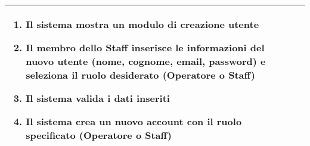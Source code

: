 \documentclass[a4paper]{report}
\begin{document}
\begin{table}[t!]
\begin{tabular}{|p{3.9cm}|p{9.9cm}|}
\begin{enumerate}[leftmargin=14pt,label=\arabic*.,labelsep=0.5em,topsep=0pt,partopsep=0pt,parsep=0pt,itemsep=0pt]
    \begin{enumerate}[label=\arabic{enumi}.\arabic*.,leftmargin=22pt,labelsep=0.5em,topsep=0pt,partopsep=0pt,parsep=0pt,itemsep=0pt]
        \item Il sistema mostra un modulo di creazione utente
        \item Il membro dello Staff inserisce le informazioni del nuovo utente (nome, cognome, email, password) e seleziona il ruolo desiderato (Operatore o Staff)
        \item Il sistema valida i dati inseriti
        \item Il sistema crea un nuovo account con il ruolo specificato (Operatore o Staff)
    \end{enumerate}
\end{enumerate}\\ \hline
\end{tabular}
\end{table}
\end{document}

